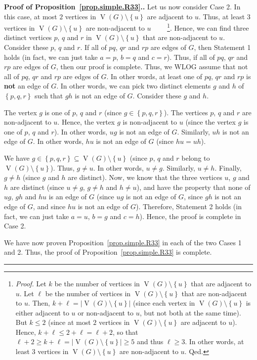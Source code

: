\documentclass[numbers=enddot,12pt,final,onecolumn,notitlepage]{scrartcl}%
\theoremstyle{definition}
\newenvironment{proof}[1][Proof]{\noindent\textbf{#1.} }{\ \rule{0.5em}{0.5em}}
\newcommand{\set}[1]{\left\{ #1 \right\}}
\newcommand{\abs}[1]{\left| #1 \right|}
\newcommand{\verts}[1]{\operatorname{V}\left( #1 \right)}
\begin{document}
\begin{proof}[Proof of Proposition~\ref{prop.simple.R33}.]
Let us now consider Case 2. In this case, at most $2$ vertices in
$\verts{G} \setminus \set{u}$ are adjacent to $u$. Thus, at least $3$
vertices in $\verts{G} \setminus \set{u}$ are non-adjacent to $u$
\ \ \ \ \footnote{\textit{Proof.} Let $k$ be the number of vertices
in $\verts{G} \setminus \set{u}$ that are adjacent to $u$. Let $\ell$
be the number of vertices in $\verts{G} \setminus \set{u}$ that are
non-adjacent to $u$. Then,
$k + \ell = \abs{\verts{G} \setminus \set{u}}$ (since each vertex
in $\verts{G} \setminus \set{u}$ is either adjacent to $u$ or
non-adjacent to $u$, but not both at the same time). But $k \leq 2$
(since at most $2$ vertices in $\verts{G} \setminus \set{u}$ are
adjacent to $u$). Hence, $k + \ell \leq 2 + \ell = \ell + 2$, so that
$\ell + 2 \geq k + \ell = \abs{\verts{G} \setminus \set{u}} \geq 5$
and thus $\ell \geq 3$. In other words, at least $3$
vertices in $\verts{G} \setminus \set{u}$ are non-adjacent to $u$.
Qed.}. Hence, we can find
three distinct vertices $p$, $q$ and $r$ in
$\verts{G} \setminus \set{u}$ that are non-adjacent to $u$. Consider
these $p$, $q$ and $r$. If all of $pq$, $qr$ and $rp$ are edges of
$G$, then Statement 1 holds (in fact, we can just take $a = p$,
$b = q$ and $c = r$). Thus, if all of $pq$, $qr$ and $rp$ are edges
of $G$, then our proof is complete. Thus, we WLOG
assume that not all of $pq$, $qr$ and $rp$ are edges of $G$. In other
words, at least one of $pq$, $qr$ and $rp$ is \textbf{not} an edge of
$G$. In other words, we can pick two distinct elements $g$ and $h$ of
$\set{p, q, r}$ such that $gh$ is not an edge of $G$. Consider
these $g$ and $h$.

The vertex $g$ is one of $p$, $q$ and $r$
(since $g \in \set{p, q, r}$).
The vertices $p$, $q$ and $r$ are non-adjacent to $u$. Hence, the
vertex $g$ is non-adjacent to $u$ (since the vertex $g$ is one of $p$,
$q$ and $r$). In other words, $ug$ is not an edge of $G$. Similarly,
$uh$ is not an edge of $G$. In other words, $hu$ is not an edge of $G$
(since $hu = uh$).

We have $g \in \set{p, q, r} \subseteq \verts{G} \setminus \set{u}$
(since $p$, $q$ and $r$ belong to $\verts{G} \setminus \set{u}$).
Thus, $g \neq u$. In other words, $u \neq g$. Similarly, $u \neq h$.
Finally, $g \neq h$ (since $g$ and $h$
are distinct). Now, we know that the three vertices $u$, $g$ and $h$
are distinct (since $u \neq g$, $g \neq h$ and $h \neq u$), and have
the property that none of $ug$, $gh$ and $hu$ is an edge of $G$ (since
$ug$ is not an edge of $G$, since $gh$ is not an edge of $G$, and
since $hu$ is not an edge of $G$). Therefore,
Statement 2 holds (in fact, we can just take $a = u$, $b = g$ and
$c = h$). Hence, the proof is complete in Case 2.

We have now proven Proposition~\ref{prop.simple.R33} in each of the
two Cases 1 and 2. Thus, the proof of
Proposition~\ref{prop.simple.R33} is complete.
\end{proof}
\end{document}
